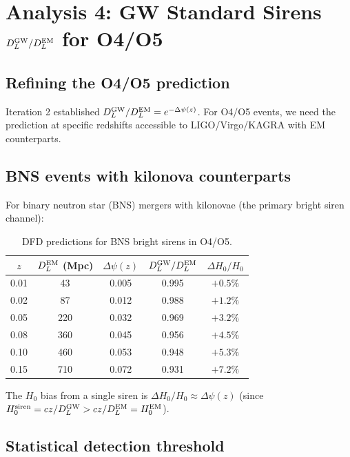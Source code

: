 \documentclass[11pt]{article}
\begin{document}
\section{Analysis 4: GW Standard Sirens $D_L^{\rm GW}/D_L^{\rm EM}$ for O4/O5}
\label{sec:sirens-iter3}

\subsection{Refining the O4/O5 prediction}

Iteration 2 established $D_L^{\rm GW}/D_L^{\rm EM} = e^{-\Delta\psi(z)}$. For O4/O5 events, we need the prediction at specific redshifts accessible to LIGO/Virgo/KAGRA with EM counterparts.

\subsection{BNS events with kilonova counterparts}

For binary neutron star (BNS) mergers with kilonovae (the primary bright siren channel):

\begin{table}[h]
\centering
\caption{DFD predictions for BNS bright sirens in O4/O5.}
\begin{tabular}{ccccc}
\toprule
$z$ & $D_L^{\rm EM}$ (Mpc) & $\Delta\psi(z)$ & $D_L^{\rm GW}/D_L^{\rm EM}$ & $\Delta H_0/H_0$ \\
\midrule
0.01 & 43 & 0.005 & 0.995 & $+0.5\%$ \\
0.02 & 87 & 0.012 & 0.988 & $+1.2\%$ \\
0.05 & 220 & 0.032 & 0.969 & $+3.2\%$ \\
0.08 & 360 & 0.045 & 0.956 & $+4.5\%$ \\
0.10 & 460 & 0.053 & 0.948 & $+5.3\%$ \\
0.15 & 710 & 0.072 & 0.931 & $+7.2\%$ \\
\bottomrule
\end{tabular}
\label{tab:sirens-O4O5}
\end{table}

The $H_0$ bias from a single siren is $\Delta H_0/H_0 \approx \Delta\psi(z)$ (since $H_0^{\rm siren} = cz/D_L^{\rm GW} > cz/D_L^{\rm EM} = H_0^{\rm EM}$).

\subsection{Statistical detection threshold}
\end{document}

